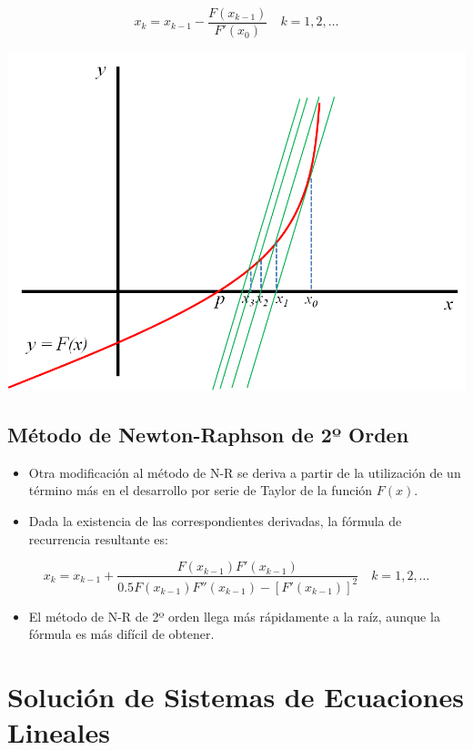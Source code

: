 \documentclass[openany]{book}
\providecommand{\tightlist}{%
  \setlength{\itemsep}{0pt}\setlength{\parskip}{0pt}}
\begin{document}
\[
x_k = x_{k-1} - \frac{F(x_{k-1})}{F'(x_{0})} \quad k = 1, 2, \dots
\]

\begin{center}\includegraphics[width=0.75\linewidth]{Plots/U2/vonMises} \end{center}

\hypertarget{muxe9todo-de-newton-raphson-de-2uxba-orden}{%
\section{Método de Newton-Raphson de 2º Orden}\label{muxe9todo-de-newton-raphson-de-2uxba-orden}}

\begin{itemize}
\tightlist
\item
  Otra modificación al método de N-R se deriva a partir de la utilización de un término más en el desarrollo por serie de Taylor de la función \(F(x)\).
\item
  Dada la existencia de las correspondientes derivadas, la fórmula de recurrencia resultante es:
\end{itemize}

\[
x_k = x_{k-1} + \frac{F(x_{k-1})F'(x_{k-1})}{0.5 F(x_{k-1}) F''(x_{k-1}) - [F'(x_{k-1})]^2} \quad k = 1, 2, \dots
\]

\begin{itemize}
\tightlist
\item
  El método de N-R de 2º orden llega más rápidamente a la raíz, aunque la fórmula es más difícil de obtener.
\end{itemize}

\hypertarget{soluciuxf3n-de-sistemas-de-ecuaciones-lineales}{%
\chapter{Solución de Sistemas de Ecuaciones Lineales}\label{soluciuxf3n-de-sistemas-de-ecuaciones-lineales}}
\end{document}

